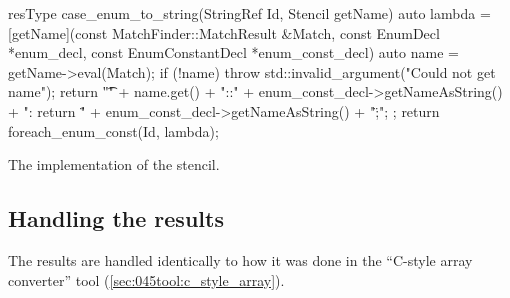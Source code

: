 \begin{listing}[H]
    \begin{cppcode}
resType case_enum_to_string(StringRef Id, Stencil getName) {
	auto lambda = [getName](const MatchFinder::MatchResult &Match, const EnumDecl *enum_decl,
					   const EnumConstantDecl *enum_const_decl) {
			auto name = getName->eval(Match);
			if (!name) {
				throw std::invalid_argument("Could not get name");
			}
			return "\t\tcase " + name.get() +
				   "::" + enum_const_decl->getNameAsString() + ": return \"" +
				   enum_const_decl->getNameAsString() + "\";\n";
		};
	return foreach_enum_const(Id, lambda);
}
    \end{cppcode}
    \caption{The implementation of the  stencil.}
    \label{code:085tool:case_enum_to_string}
\end{listing}

\subsection{Handling the results}
The results are handled identically to how it was done in the ``C-style array converter'' tool (\cref{sec:045tool:c_style_array}).